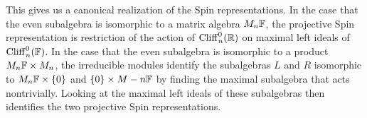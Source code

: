 This gives us a canonical realization of the Spin representations. In the
case that the even subalgebra is isomorphic to a matrix algebra $M_n\mathbb{F}$,
the projective Spin representation is restriction of the action of
$\operatorname{Cliff}_n^0(\mathbb{R})$ on maximal left ideals of $\operatorname{Cliff}_n^0(\mathbb{F})$. In the case
that the even subalgebra is isomorphic to a product $M_n\mathbb{F} \times M_n$,
the irreducible modules identify the subalgebras $L$ and $R$
isomorphic to $M_n\mathbb{F} \times \left\lbrace 0 \right\rbrace$ and $\left\lbrace 0 \right\rbrace \times M-n\mathbb{F}$ by finding the
maximal subalgebra that acts nontrivially. Looking at the maximal left ideals
of these subalgebras then identifies the two projective Spin representations.
%
